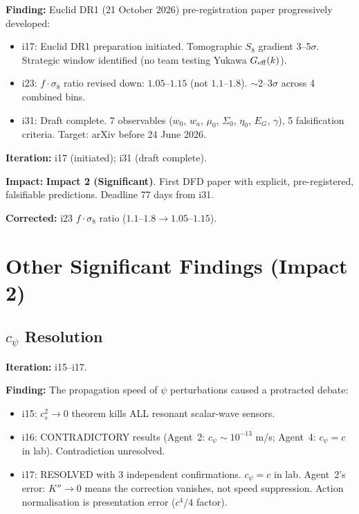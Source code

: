 \documentclass[11pt,a4paper]{article}
\newcommand{\imptwo}{\textcolor{impact2}{\textbf{Impact 2 (Significant)}}}
\begin{document}
\begin{tcolorbox}[colback=green!5!white, colframe=green!50!black,
  title=\textbf{Euclid DR1 Pre-Registration --- Iterations 17--31}]

\textbf{Finding:} Euclid DR1 (21 October 2026) pre-registration paper
progressively developed:
\begin{itemize}
  \item i17: Euclid DR1 preparation initiated. Tomographic $S_8$ gradient
    3--5$\sigma$. Strategic window identified (no team testing Yukawa
    $G_{\rm eff}(k)$).
  \item i23: $f \cdot \sigma_8$ ratio revised down: $1.05$--$1.15$ (not
    $1.1$--$1.8$). $\sim$2--3$\sigma$ across 4 combined bins.
  \item i31: Draft complete. 7 observables ($w_0$, $w_a$, $\mu_0$,
    $\Sigma_0$, $\eta_0$, $E_G$, $\gamma$), 5 falsification criteria.
    Target: arXiv before 24 June 2026.
\end{itemize}

\textbf{Iteration:} i17 (initiated); i31 (draft complete).

\textbf{Impact:} \imptwo. First DFD paper with explicit, pre-registered,
falsifiable predictions. Deadline 77 days from i31.

\textbf{Corrected:} i23 $f \cdot \sigma_8$ ratio ($1.1$--$1.8 \to
1.05$--$1.15$).

\end{tcolorbox}


\section{Other Significant Findings (Impact 2)}
\label{sec:other-impact2}

\subsection{$c_\psi$ Resolution}

\textbf{Iteration:} i15--i17.

\textbf{Finding:} The propagation speed of $\psi$ perturbations caused
a protracted debate:
\begin{itemize}
  \item i15: $c_s^2 \to 0$ theorem kills ALL resonant scalar-wave sensors.
  \item i16: CONTRADICTORY results (Agent~2: $c_\psi \sim 10^{-13}$ m/s;
    Agent~4: $c_\psi = c$ in lab). Contradiction unresolved.
  \item i17: RESOLVED with 3 independent confirmations. $c_\psi = c$ in lab.
    Agent~2's error: $K'' \to 0$ means the correction vanishes, not speed
    suppression. Action normalisation is presentation error ($c^4/4$ factor).
\end{itemize}
\end{document}
